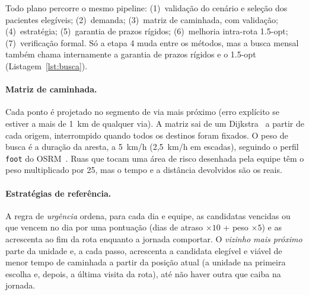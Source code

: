\documentclass[11pt,a4paper]{article}
\begin{document}
Todo plano percorre o mesmo pipeline: (1)~validação do cenário e seleção dos pacientes elegíveis; (2)~demanda; (3)~matriz de caminhada, com validação; (4)~estratégia; (5)~garantia de prazos rígidos; (6)~melhoria intra-rota 1.5-opt; (7)~verificação formal. Só a etapa 4 muda entre os métodos, mas a busca mensal também chama internamente a garantia de prazos rígidos e o 1.5-opt (Listagem~\ref{lst:busca}).

\paragraph{Matriz de caminhada.} Cada ponto é projetado no segmento de via mais próximo (erro explícito se estiver a mais de 1~km de qualquer via). A matriz sai de um Dijkstra~\cite{dijkstra1959} a partir de cada origem, interrompido quando todos os destinos foram fixados. O peso de busca é a duração da aresta, a 5~km/h (2,5~km/h em escadas), seguindo o perfil \texttt{foot} do OSRM~\cite{luxen2011}. Ruas que tocam uma área de risco desenhada pela equipe têm o peso multiplicado por 25, mas o tempo e a distância devolvidos são os reais.

\paragraph{Estratégias de referência.} A regra de \emph{urgência} ordena, para cada dia e equipe, as candidatas vencidas ou que vencem no dia por uma pontuação (dias de atraso $\times 10$ + peso $\times 5$) e as acrescenta ao fim da rota enquanto a jornada comportar. O \emph{vizinho mais próximo} parte da unidade e, a cada passo, acrescenta a candidata elegível e viável de menor tempo de caminhada a partir da posição atual (a unidade na primeira escolha e, depois, a última visita da rota), até não haver outra que caiba na jornada.
\end{document}
